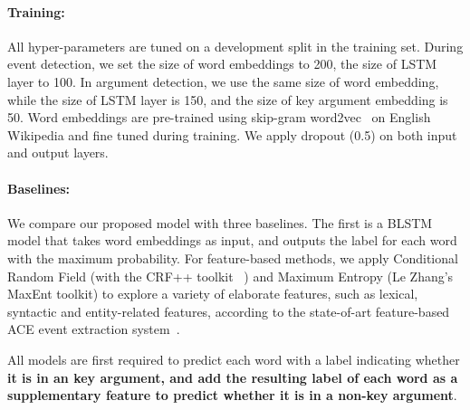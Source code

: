 \paragraph{Training:} All hyper-parameters are tuned on a development split in the training set. During event detection, we set the size of word embeddings to 200, the size of LSTM layer to 100. In argument detection, we use the same size of word embedding, while the size of LSTM layer is 150, and the size of key argument embedding is 50. Word embeddings are pre-trained using skip-gram word2vec~\cite{mikolov2013distributed} on English Wikipedia and fine tuned during training. We apply dropout (0.5) on both input and output layers.




\paragraph{Baselines:}
We compare our proposed model with three baselines. %
The first is a  BLSTM model that takes word embeddings as input, and outputs the label for each word with the maximum probability. %
For feature-based methods, we apply Conditional Random Field \cite{lafferty2001conditional} (with the CRF++ toolkit~\cite{kudo2005crf++} ) and Maximum Entropy \cite{berger1996maximum} (Le Zhang's MaxEnt toolkit) to explore a variety of elaborate features, such as lexical, syntactic and entity-related features, according to the state-of-art feature-based ACE event extraction system~\cite{li2013joint}.

All models are first required to predict each word with a label indicating whether \textbf{it is in an key argument, and add the resulting label of each word as a supplementary feature to predict whether it is in a non-key argument}.



